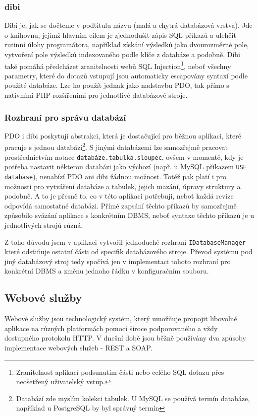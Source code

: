 \documentclass[11pt,twoside,a4paper]{book}
\begin{document}
\subsubsection{dibi}
Dibi je, jak se dočteme v podtitulu názvu  (malá a chytrá databázová vrstva). Jde o knihovnu, jejímž hlavním cílem je zjednodušit zápis SQL příkazů a ulehčit rutinní úlohy programátora, například získání výsledků jako dvourozměrné pole, vytvoření pole výsledků indexovaného podle klíče z databáze a podobně. Dibi také pomáhá předcházet zranitelnosti webů SQL Injection\footnote{Zranitelnost aplikací podsunutím části nebo celého SQL dotazu přes neošetřený uživatelský vstup.}, neboť všechny parametry, které do dotazů vstupují jsou automaticky escapovány syntaxí podle použité databáze. Lze ho použít jednak jako nadstavbu PDO, tak přímo s nativními PHP rozšířeními pro jednotlivé databázové stroje.
\label{idatabasemanager}
\subsubsection{Rozhraní pro správu databází}
PDO i dibi poskytují abstrakci, která je dostačující pro běžnou aplikaci, které pracuje s jednou databází\footnote{Databází zde myslím kolekci tabulek. U MySQL se používá termín databáze, například u PostgreSQL by byl správný termín }. S jinými databázemi lze samozřejmě pracovat prostřednictvím  notace {\tt databáze.tabulka.sloupec}, ovšem v momentě, kdy je potřeba nastavit některou databázi jako výchozí (např. u MySQL příkazem {\tt USE database}), nenabízí PDO ani dibi žádnou možnost. Totéž pak platí i pro možnosti pro vytváření databáze a tabulek, jejich mazání, úpravy struktury a podobně.  A to je přesně to, co v této aplikaci potřebuji, neboť každá revize odpovídá samostatné databázi. Přímé zapsání těchto příkazů by samozřejmě způsobilo svázání aplikace s konkrétním DBMS, neboť syntaxe těchto příkazů je u jednotlivých strojů různá.

Z toho důvodu jsem v aplikaci vytvořil jednoduché rozhraní {\tt IDatabaseManager} které odstiňuje ostatní části od specifik databázového stroje. Převod systému pod jiný databázový stroj tedy spočívá jen v implementaci tohoto rozhraní pro konkrétní DBMS a změnu jednoho řádku v konfiguračním souboru.

\subsection{Webové služby}
Webové služby jsou technologický systém, který umožňuje propojit libovolné aplikace na různých platformách pomocí široce podporovaného a vždy dostupného protokolu HTTP. V dnešní době jsou běžně používány dva způsoby implementace webových služeb - REST a SOAP.
\end{document}
